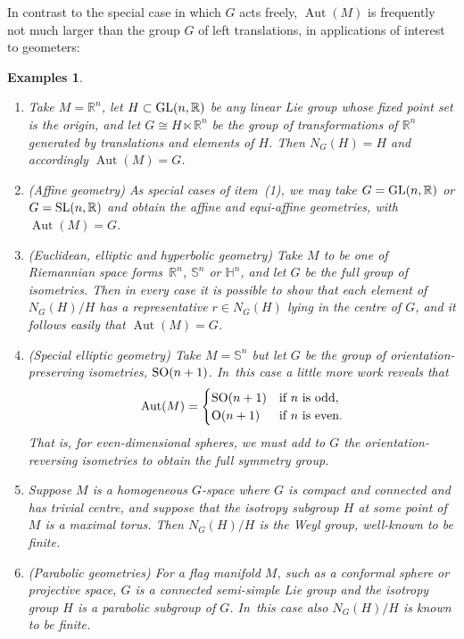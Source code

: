 \documentclass[pdftex]{sigma}%
\numberwithin{equation}{section}
\newtheorem{Examples}[Theorem]{Examples}
\DeclareMathOperator{\automorphism}{Aut}
\begin{document}
In contrast to the special case in which $G$ acts freely,
$\automorphism(M)$ is frequently not much larger than the group $G$ of
left translations, in applications of interest to geometers:
\begin{Examples}%
\mbox{}
\begin{enumerate}\itemsep=0pt
\item %
Take $M={\mathbb R}^n$, let $H \subset
{\rm GL}(n,{\mathbb R})$ be any linear Lie group whose fixed point
set is the origin, and let $G \cong H \ltimes {\mathbb R}^n $ be the
group of transformations of ${\mathbb R}^n $ generated by translations
and elements of $H$. Then $N_G(H)=H$ and accordingly
$\automorphism(M)=G$.

\item ({\it Affine geometry}) As special cases of item~(1), we may take
$G={\rm GL}(n,{\mathbb R})$ or $G={\rm SL}(n,{\mathbb R})$ and
obtain the affine and equi-affine geometries, with
$\automorphism(M)=G$.

\item %
({\it Euclidean, elliptic and hyperbolic geometry}) Take
$M$ to be one of Riemannian space forms~${\mathbb R}^n$, ${\mathbb S}^n$ or
${\mathbb H}^n $, and let $G$ be the full group of isometries. Then in
every case it is possible to show that each element of $N_G(H)/H$ has
a representative $r \in N_G(H) $ lying in the centre of $G$, and it
follows easily that $\automorphism(M)=G$.

\item ({\it Special elliptic geometry}) Take $M = {\mathbb S}^n$ but let $G$ be the
group of {\em orientation-preserving} isometries,
${\rm SO}(n+1)$. In~this case a little more work reveals that
 \begin{equation*}
 \automorphism(M)=
 \begin{cases}
{\rm SO}(n+1)&\text{if $n$ is odd},\\
{\rm O}(n+1)&\text{if $n $ is even}.
 \end{cases}
 \end{equation*}
 That is, for even-dimensional spheres, we must add
to $G$ the orientation-reversing isometries to obtain the full
symmetry group.

\item %
Suppose $M$ is a homogeneous $G$-space where $G$ is
compact and connected and has trivial centre, and suppose that the
isotropy subgroup $H$ at some point of $M$ is a maximal torus. Then
$N_G(H)/H$ is the Weyl group, well-known to be {\em finite}.

\item ({\it Parabolic geometries}) For a flag manifold $M$, such as a
conformal sphere or projective space, $G$ is a connected semi-simple
Lie group and the isotropy group $H$ is a parabolic subgroup of
$G$. In~this case also $N_G(H)/H$ is known to be finite.
\end{enumerate}
\end{Examples}
\end{document}
